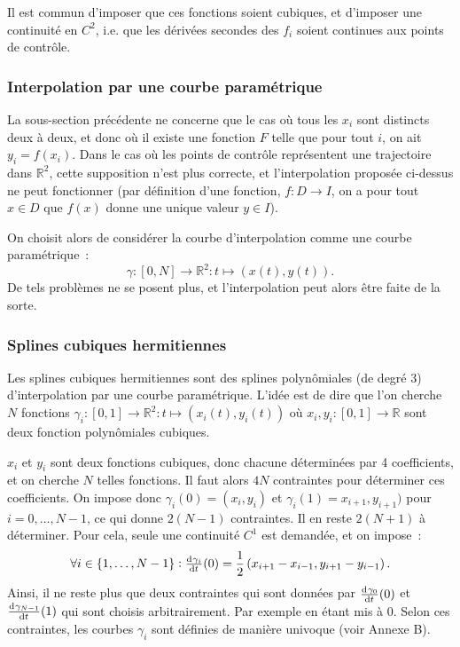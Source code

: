 \documentclass[10pt,journal,compsoc]{IEEEtran}
\newcommand{\R}{\mathbb R}
\begin{document}
	  Il est commun d'imposer que ces fonctions soient cubiques, et d'imposer une continuité en $C^2$, i.e. que les dérivées secondes des $f_i$ soient continues aux
	  points de contrôle.
    \subsubsection{Interpolation par une courbe paramétrique}
	  La sous-section précédente ne concerne que le cas où tous les $x_i$ sont distincts deux à deux, et donc où il existe une fonction $F$ telle que pour tout $i$,
	  on ait $y_i = f(x_i)$. Dans le cas où les points de contrôle représentent une trajectoire dans $\R^2$, cette supposition n'est plus correcte, et l'interpolation
	  proposée ci-dessus ne peut fonctionner (par définition d'une fonction, $f : D \to I$, on a pour tout $x \in D$ que $f(x)$ donne une unique valeur $y \in I$).

	  On choisit alors de considérer la courbe d'interpolation comme une courbe paramétrique~:
	  \begin{equation}
	  	\gamma : [0, N] \to \R^2 : t \mapsto (x(t), y(t)).
      \end{equation}
	  De tels problèmes ne se posent plus, et l'interpolation peut alors être faite de la sorte.
	\subsubsection{Splines cubiques hermitiennes}\label{subsub:splines3herm}
	  Les splines cubiques hermitiennes sont des splines polynômiales (de degré 3) d'interpolation par une courbe paramétrique. L'idée est de dire que l'on cherche
	  $N$ fonctions $\gamma_i : [0, 1] \to \R^2 : t \mapsto (x_i(t), y_i(t))$ où $x_i, y_i : [0, 1] \to \R$ sont deux fonction polynômiales cubiques.

	  $x_i$ et $y_i$ sont deux fonctions cubiques, donc chacune déterminées par 4 coefficients, et on cherche $N$ telles fonctions. Il faut alors $4N$ contraintes
	  pour déterminer ces coefficients. On impose donc $\gamma_i(0) = (x_i, y_i)$ et $\gamma_i(1) = x_{i+1}, y_{i+1})$ pour $i = 0, \ldots, {N-1}$, ce qui donne $2(N-1)$
	  contraintes. Il en reste $2(N+1)$ à déterminer. Pour cela, seule une continuité $C^1$ est demandée, et on impose~:
	  \begin{equation}
	  	\forall i \in \{1, \ldots, N-1\} : \od {\gamma_i}t(0) = \frac 12\left(x_{i+1}-x_{i-1}, y_{i+1}-y_{i-1}\right).
	  \end{equation}
	  Ainsi, il ne reste plus que deux contraintes qui sont données par $\od {\gamma_0}t(0)$ et $\od {\gamma_{N-1}}t(1)$ qui sont choisis arbitrairement. Par exemple
	  en étant mis à 0. Selon ces contraintes, les courbes $\gamma_i$ sont définies de manière univoque (voir Annexe B).
\end{document}
